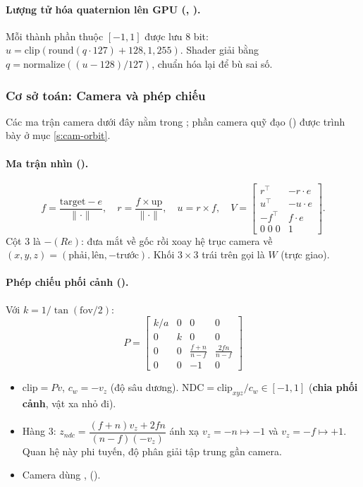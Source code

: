 \paragraph{Lượng tử hóa quaternion lên GPU (, ).}
Mỗi thành phần thuộc $[-1,1]$ được lưu 8 bit: $u=\mathrm{clip}(\mathrm{round}(q\cdot127)+128,1,255)$. Shader giải bằng $q=\mathrm{normalize}((u-128)/127)$, chuẩn hóa lại để bù sai số.

\subsubsection{Cơ sở toán: Camera và phép chiếu}\label{s:cam}
Các ma trận camera dưới đây nằm trong ; phần camera quỹ đạo  () được trình bày ở mục \ref{s:cam-orbit}.

\paragraph{Ma trận nhìn ().}
\[
f=\frac{\mathrm{target}-e}{\|\cdot\|},\quad r=\frac{f\times \mathrm{up}}{\|\cdot\|},\quad u=r\times f,\quad
V=\begin{bmatrix} r^{\top} & -r\!\cdot\! e\\ u^{\top} & -u\!\cdot\! e\\ -f^{\top} & f\!\cdot\! e\\ 0\;0\;0 & 1\end{bmatrix}.
\]
Cột 3 là $-(Re)$: đưa mắt về gốc rồi xoay hệ trục camera về $(x,y,z)=(\text{phải},\text{lên},-\text{trước})$. Khối $3\times3$ trái trên gọi là $W$ (trực giao).

\paragraph{Phép chiếu phối cảnh ().}
Với $k=1/\tan(\mathrm{fov}/2)$:
\[
P=\begin{bmatrix}k/a&0&0&0\\0&k&0&0\\0&0&\frac{f+n}{n-f}&\frac{2fn}{n-f}\\0&0&-1&0\end{bmatrix}
\]
\begin{itemize}
\item $\mathrm{clip}=Pv$, $c_w=-v_z$ (độ sâu dương). $\mathrm{NDC}=\mathrm{clip}_{xyz}/c_w\in[-1,1]$ (\textbf{chia phối cảnh}, vật xa nhỏ đi).
\item Hàng 3: $z_{ndc}=\dfrac{(f+n)v_z+2fn}{(n-f)(-v_z)}$ ánh xạ $v_z=-n\mapsto-1$ và $v_z=-f\mapsto+1$. Quan hệ này phi tuyến, độ phân giải tập trung gần camera.
\item Camera dùng ,  ().
\end{itemize}

